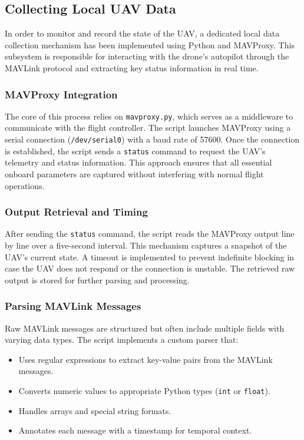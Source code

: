 \subsection{Collecting Local UAV Data}

In order to monitor and record the state of the UAV, a dedicated local data collection mechanism has been implemented using Python and MAVProxy. This subsystem is responsible for interacting with the drone’s autopilot through the MAVLink protocol and extracting key status information in real time.

\subsubsection{MAVProxy Integration}

The core of this process relies on \texttt{mavproxy.py}, which serves as a middleware to communicate with the flight controller. The script launches MAVProxy using a serial connection (\texttt{/dev/serial0}) with a baud rate of 57600. Once the connection is established, the script sends a \texttt{status} command to request the UAV’s telemetry and status information. This approach ensures that all essential onboard parameters are captured without interfering with normal flight operations.

\subsubsection{Output Retrieval and Timing}

After sending the \texttt{status} command, the script reads the MAVProxy output line by line over a five-second interval. This mechanism captures a snapshot of the UAV’s current state. A timeout is implemented to prevent indefinite blocking in case the UAV does not respond or the connection is unstable. The retrieved raw output is stored for further parsing and processing.

\subsubsection{Parsing MAVLink Messages}

Raw MAVLink messages are structured but often include multiple fields with varying data types. The script implements a custom parser that:

\begin{itemize}
    \item Uses regular expressions to extract key-value pairs from the MAVLink messages.
    \item Converts numeric values to appropriate Python types (\texttt{int} or \texttt{float}).
    \item Handles arrays and special string formats.
    \item Annotates each message with a timestamp for temporal context.
\end{itemize}

